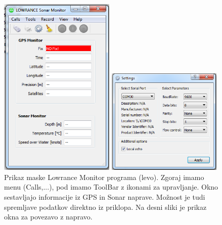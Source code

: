 \documentclass[11pt]{article}
\begin{document}
\begin{figure}[!h]
	\begin{minipage}{5.5cm}
		\centering \includegraphics[width=5.5cm]{figs/no_fix.png}
	\end{minipage}
	\begin{minipage}{5.5cm}
		\centering \includegraphics[width=5.5cm]{figs/connect.png}
		\vspace{3.3cm}
	\end{minipage}	
	\caption{Prikaz maske Lowrance Monitor programa (levo). Zgoraj imamo menu (Calls,...), pod imamo ToolBar z ikonami za upravljanje. Okno sestavljajo informacije iz GPS in Sonar naprave. Možnost je tudi spremljave podatkov direktno iz priklopa. Na desni sliki je prikaz okna za povezavo z napravo.}
	\label{fig:v_est_lmp_01}
\end{figure}
\end{document}
